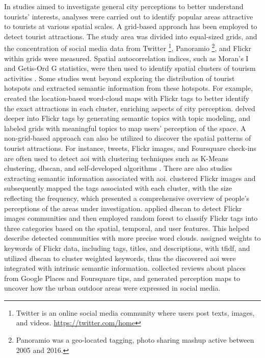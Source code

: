 \documentclass{article}
\begin{document}
In studies aimed to investigate general city perceptions to better understand tourists' interests, analyses were carried out to identify popular areas attractive to tourists at various spatial scales. A grid-based approach has been employed to detect tourist attractions. The study area was divided into equal-sized grids, and the concentration of social media data from Twitter \footnote{Twitter is an online social media community where users post texts, images, and videos. \url{https://twitter.com/home}}, Panoramio \footnote{Panoramio was a geo-located tagging, photo sharing mashup active between 2005 and 2016.}, and Flickr within grids were measured. Spatial autocorrelation indices, such as Moran's I and Getis-Ord G statistics, were then used to identify spatial clusters of tourism activities \citep{garcia-palomares_identification_2015, kim_coastal_2021}. Some studies went beyond exploring the distribution of tourist hotspots and extracted semantic information from these hotspots. For example, \cite{li_analyzing_2018} created the location-based word-cloud maps with Flickr tags to better identify the exact attractions in each cluster, enriching aspects of city perception. \cite{bahrehdar_description_2018} delved deeper into Flickr tags by generating semantic topics with topic modeling, and labeled grids with meaningful topics to map users' perception of the space. A non-grid-based approach can also be utilized to discover the spatial patterns of tourist attractions. For instance, tweets, Flickr images, and Foursquare check-ins are often used to detect \acrfull{aoi} with clustering techniques such as K-Means clustering, \acrfull{dbscan}, and self-developed algorithms \cite{hu_extracting_2015, hasnat_identifying_2018, cranshaw_livehoods_2021}. There are also studies extracting semantic information associated with \acrshort{aoi}. \cite{dunkel_visualizing_2015} clustered Flickr images and subsequently mapped the tags associated with each cluster, with the size reflecting the frequency, which presented a comprehensive overview of people's perceptions of the areas under investigation. \cite{zhou_detecting_2015} applied \acrshort{dbscan} to detect Flickr images communities and then employed random forest to classify Flickr tags into three categories based on the spatial, temporal, and user features. This helped describe detected communities with more precise word clouds. \cite{jailani_machine_2021} assigned weights to keywords of Flickr data, including tags, titles, and descriptions, with \acrfull{tfidf}, and utilized \acrshort{dbscan} to cluster weighted keywords, thus the discovered \acrshort{aoi} were integrated with intrinsic semantic information. \cite{santos_uncovering_2018} collected reviews about places from Google Places and Foursquare tips, and generated perception maps to uncover how the urban outdoor areas were expressed in social media.
\end{document}
